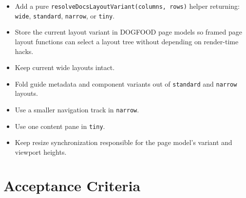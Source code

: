 \begin{itemize}
\tightlist
\item
  Add a pure \texttt{r\allowbreak{}e\allowbreak{}s\allowbreak{}o\allowbreak{}l\allowbreak{}v\allowbreak{}e\allowbreak{}D\allowbreak{}o\allowbreak{}c\allowbreak{}s\allowbreak{}L\allowbreak{}a\allowbreak{}y\allowbreak{}o\allowbreak{}u\allowbreak{}t\allowbreak{}V\allowbreak{}a\allowbreak{}r\allowbreak{}i\allowbreak{}a\allowbreak{}n\allowbreak{}t\allowbreak{}(\allowbreak{}c\allowbreak{}o\allowbreak{}l\allowbreak{}u\allowbreak{}m\allowbreak{}n\allowbreak{}s\allowbreak{},\allowbreak{} \allowbreak{}r\allowbreak{}o\allowbreak{}w\allowbreak{}s\allowbreak{})} helper returning: \texttt{w\allowbreak{}i\allowbreak{}d\allowbreak{}e}, \texttt{s\allowbreak{}t\allowbreak{}a\allowbreak{}n\allowbreak{}d\allowbreak{}a\allowbreak{}r\allowbreak{}d}, \texttt{n\allowbreak{}a\allowbreak{}r\allowbreak{}r\allowbreak{}o\allowbreak{}w}, or \texttt{t\allowbreak{}i\allowbreak{}n\allowbreak{}y}.
\item
  Store the current layout variant in DOGFOOD page models so framed page layout functions can select a layout tree without depending on render-time hacks.
\item
  Keep current wide layouts intact.
\item
  Fold guide metadata and component variants out of \texttt{s\allowbreak{}t\allowbreak{}a\allowbreak{}n\allowbreak{}d\allowbreak{}a\allowbreak{}r\allowbreak{}d} and \texttt{n\allowbreak{}a\allowbreak{}r\allowbreak{}r\allowbreak{}o\allowbreak{}w} layouts.
\item
  Use a smaller navigation track in \texttt{n\allowbreak{}a\allowbreak{}r\allowbreak{}r\allowbreak{}o\allowbreak{}w}.
\item
  Use one content pane in \texttt{t\allowbreak{}i\allowbreak{}n\allowbreak{}y}.
\item
  Keep resize synchronization responsible for the page model's variant and viewport heights.
\end{itemize}

\section{Acceptance Criteria}\label{record-108-acceptance-criteria}

